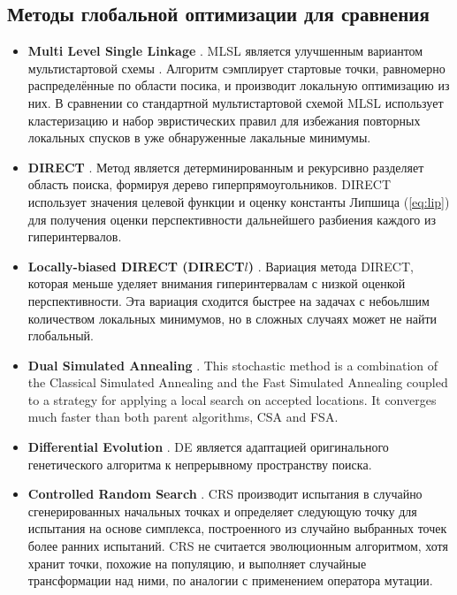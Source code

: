 \subsection{Методы глобальной оптимизации для сравнения}
\begin{itemize}
  \item \textbf{Multi Level Single Linkage} \cite{Kan1987StochasticGO}. MLSL является улучшенным вариантом мультистартовой схемы \cite{}.
  Алгоритм сэмплирует стартовые точки, равномерно распределённые по области посика, и производит локальную оптимизацию из них.
  В сравнении со стандартной мультистартовой схемой MLSL использует кластеризацию и набор эвристических правил
  для избежания повторных локальных спусков в уже обнаруженные лакальные минимумы.

  \item \textbf{DIRECT} \cite{Jones2009}. Метод является детерминированным и рекурсивно разделяет
  область поиска, формируя дерево гиперпрямоугольников. DIRECT использует значения целевой функции и
  оценку константы Липшица (\ref{eq:lip}) для получения оценки перспективности дальнейшего разбиения каждого из гиперинтервалов.

  \item \textbf{Locally-biased DIRECT (DIRECT$l$)} \cite{Gablonsky2001}. Вариация метода
  DIRECT, которая меньше уделяет внимания гиперинтервалам с низкой оценкой перспективности.
  Эта вариация сходится быстрее на задачах с небоьлшим количеством локальных минимумов,
  но в сложных случаях может не найти глобальный.

  \item \textbf{Dual Simulated Annealing} \cite{XIANG1997216}. This stochastic method is a
combination of the Classical Simulated Annealing and the Fast Simulated Annealing coupled to a
strategy for applying a local search on accepted locations. It converges much faster than both parent
algorithms, CSA and FSA.

  \item \textbf{Differential Evolution} \cite{Storn1997}. DE является адаптацией оригинального генетического алгоритма
  к непрерывному пространству поиска.

  \item \textbf{Controlled Random Search} \cite{Price1983}. CRS производит испытания в случайно сгенерированных начальных
  точках и определяет следующую точку для испытания на основе симплекса, построенного из случайно выбранных точек более ранних испытаний.
  CRS не считается эволюционным алгоритмом, хотя хранит точки, похожие на популяцию, и выполняет случайные трансформации над ними,
  по аналогии с применением оператора мутации.


\end{itemize}
